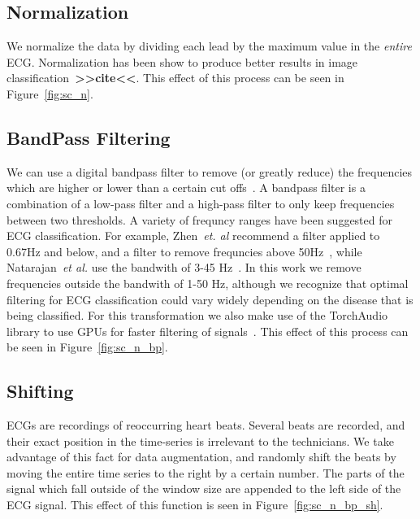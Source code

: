 \documentclass{article}
\begin{document}
\subsection{Normalization}
We normalize the data by dividing each lead by the maximum value in the \textit{entire} ECG. Normalization has been show to produce better results in image classification~\textbf{>>cite<<}. This effect of this process can be seen in Figure~\ref{fig:sc_n}.
\subsection{BandPass Filtering}

We can use a digital bandpass filter to remove (or greatly reduce) the frequencies which are higher or lower than a certain cut offs~\cite{lyons1997understanding}. A bandpass filter is a combination of a low-pass filter and a high-pass filter to only keep frequencies between two thresholds. A variety of frequncy ranges have been suggested for ECG classification. For example, Zhen~\textit{et. al} recommend a filter applied to 0.67Hz and below, and a filter to remove frequncies above 50Hz~\cite{zheng202012}, while Natarajan~\textit{et al.} use the bandwith of 3-45 Hz~\cite{natarajan2020wide}. In this work we remove frequencies outside the bandwith of 1-50 Hz, although we recognize that optimal filtering for ECG classification could vary widely depending on the disease that is being classified. For this transformation we also make use of the TorchAudio library to use GPUs for faster filtering of signals~\cite{yang2021torchaudio}. This effect of this process can be seen in Figure~\ref{fig:sc_n_bp}.
\subsection{Shifting}
ECGs are recordings of reoccurring heart beats. Several beats are recorded, and their exact position in the time-series is irrelevant to the technicians. We take advantage of this fact for data augmentation, and randomly shift the beats by moving the entire time series to the right by a certain number. The parts of the signal which fall outside of the window size are appended to the left side of the ECG signal. This effect of this function is seen in Figure~\ref{fig:sc_n_bp_sh}.
\end{document}
